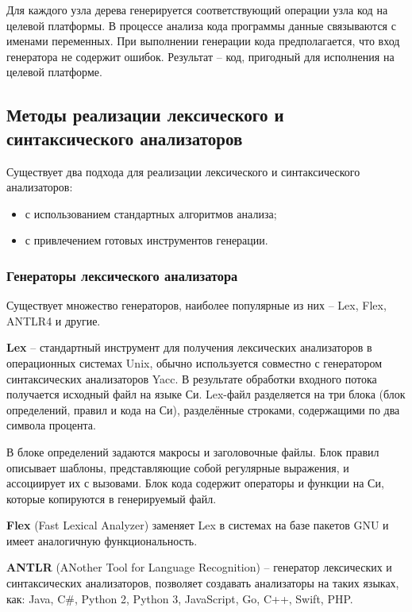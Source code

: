 Для каждого узла дерева генерируется соответствующий операции узла код на целевой платформы. В процессе анализа кода программы данные связываются с именами переменных. При выполнении генерации кода предполагается, что вход генератора не содержит ошибок. Результат -- код, пригодный для исполнения на целевой платформе. \\

\subsection{Методы реализации лексического и синтаксического анализаторов}
Существует два подхода для реализации лексического и синтаксического анализаторов:
\begin{itemize}
	\item с использованием стандартных алгоритмов анализа;
	
	\item с привлечением готовых инструментов генерации. \\
\end{itemize}

\subsubsection{Генераторы лексического анализатора}
Существует множество генераторов, наиболее популярные из них -- Lex, Flex, ANTLR4 и другие. 

\textbf{Lex} -- стандартный инструмент для получения лексических анализаторов в операционных системах Unix, обычно используется совместно с генератором синтаксических анализаторов Yacc. В результате обработки входного потока получается исходный файл на языке Си. Lex-файл разделяется на три блока (блок определений, правил и кода на Си), разделённые строками, содержащими по два символа процента. \cite{bib:lex}

В блоке определений задаются макросы и заголовочные файлы. Блок правил описывает шаблоны, представляющие собой регулярные выражения, и ассоциирует их с вызовами. Блок кода  содержит операторы и функции на Си, которые копируются в генерируемый файл.

\textbf{Flex} (Fast Lexical Analyzer) заменяет Lex в системах на базе пакетов GNU и имеет аналогичную функциональность. \cite{bib:flex}

\textbf{ANTLR} (ANother Tool for Language Recognition) -- генератор лексических и синтаксических анализаторов, позволяет создавать анализаторы на таких языках, как: Java, C\#, Python 2, Python 3, JavaScript, Go, C++, Swift, PHP. \cite{bib:antlr4}

